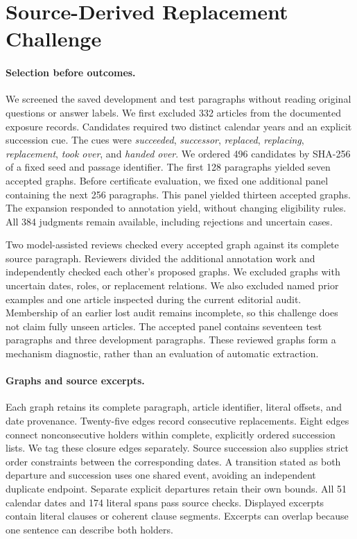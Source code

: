 \section{Source-Derived Replacement Challenge}
\label{app:replacement}

\paragraph{Selection before outcomes.}
We screened the saved development and test paragraphs without reading original questions or answer labels.
We first excluded 332 articles from the documented exposure records.
Candidates required two distinct calendar years and an explicit succession cue.
The cues were \emph{succeeded}, \emph{successor}, \emph{replaced}, \emph{replacing}, \emph{replacement}, \emph{took over}, and \emph{handed over}.
We ordered 496 candidates by SHA-256 of a fixed seed and passage identifier.
The first 128 paragraphs yielded seven accepted graphs.
Before certificate evaluation, we fixed one additional panel containing the next 256 paragraphs.
This panel yielded thirteen accepted graphs.
The expansion responded to annotation yield, without changing eligibility rules.
All 384 judgments remain available, including rejections and uncertain cases.

Two model-assisted reviews checked every accepted graph against its complete source paragraph.
Reviewers divided the additional annotation work and independently checked each other's proposed graphs.
We excluded graphs with uncertain dates, roles, or replacement relations.
We also excluded named prior examples and one article inspected during the current editorial audit.
Membership of an earlier lost audit remains incomplete, so this challenge does not claim fully unseen articles.
The accepted panel contains seventeen test paragraphs and three development paragraphs.
These reviewed graphs form a mechanism diagnostic, rather than an evaluation of automatic extraction.

\paragraph{Graphs and source excerpts.}
Each graph retains its complete paragraph, article identifier, literal offsets, and date provenance.
Twenty-five edges record consecutive replacements.
Eight edges connect nonconsecutive holders within complete, explicitly ordered succession lists.
We tag these closure edges separately.
Source succession also supplies strict order constraints between the corresponding dates.
A transition stated as both departure and succession uses one shared event, avoiding an independent duplicate endpoint.
Separate explicit departures retain their own bounds.
All 51 calendar dates and 174 literal spans pass source checks.
Displayed excerpts contain literal clauses or coherent clause segments.
Excerpts can overlap because one sentence can describe both holders.

